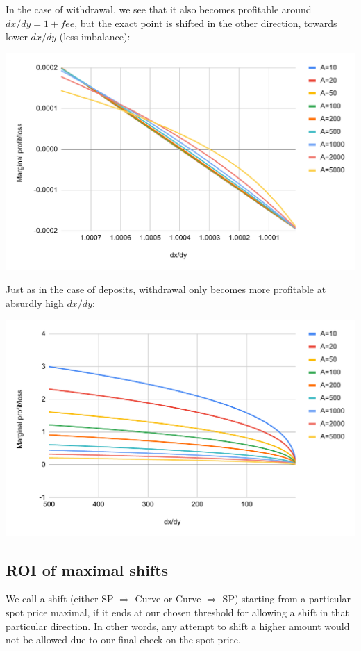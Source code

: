 \documentclass{article}
\begin{document}
In the case of withdrawal, we see that it also becomes profitable around $dx/dy = 1+fee$, but the exact point is shifted in the other direction, towards lower $dx/dy$ (less imbalance):

\includegraphics[width=\linewidth]{./LUSDChickenBonds_Shifting_Profitability_3.png}

Just as in the case of deposits, withdrawal only becomes more profitable at absurdly high $dx/dy$:

\includegraphics[width=\linewidth]{./LUSDChickenBonds_Shifting_Profitability_4.png}

\subsection{ROI of maximal shifts}

We call a shift (either SP $\Rightarrow$ Curve or Curve $\Rightarrow$ SP) starting from a particular spot price maximal, if it ends at our chosen threshold for allowing a shift in that particular direction. In other words, any attempt to shift a higher amount would not be allowed due to our final check on the spot price.
\end{document}
